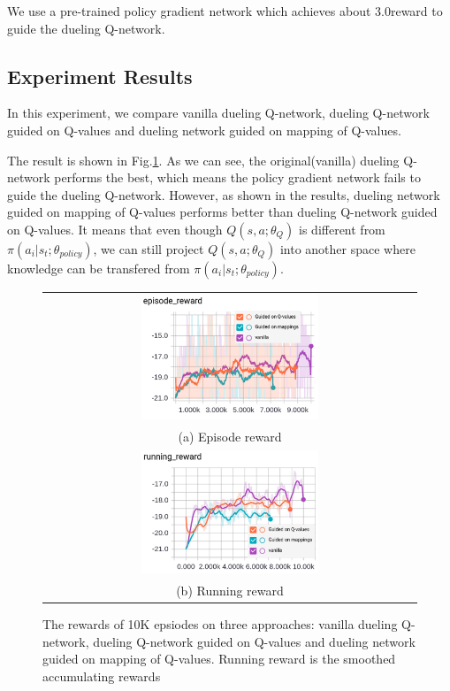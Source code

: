 %
We use a pre-trained policy gradient network which achieves about $3.0$reward to guide the dueling Q-network.


\subsection{Experiment Results}

In this experiment, we compare vanilla dueling Q-network, dueling Q-network guided on Q-values and dueling network guided on mapping of Q-values.

The result is shown in Fig.\ref{fig:mimic_result}. As we can see, the original(vanilla) dueling Q-network performs the best, which means the policy gradient network fails to guide the dueling Q-network.
%
However, as shown in the results, dueling network guided on mapping of Q-values performs better than dueling Q-network guided on Q-values. It means that even though $Q(s,a;\theta_{Q})$ is different from $\pi(a_i|s_t;\theta_{policy})$, we can still project $Q(s,a;\theta_{Q})$ into another space where knowledge can be transfered from $\pi(a_i|s_t;\theta_{policy})$.
\begin{figure}[h!]
	\centering
	\begin{tabular}{c}
		\includegraphics[width=0.49\textwidth]{./fig/mimic_result_episode.png} \\
		(a) Episode reward \\
		\includegraphics[width=0.49\textwidth]{./fig/mimic_result_running.png} \\
		(b) Running reward \\
	\end{tabular}
	\caption{The rewards of 10K epsiodes on three approaches: vanilla dueling Q-network, dueling Q-network guided on Q-values and dueling network guided on mapping of Q-values. Running reward is the smoothed accumulating rewards}
	\label{fig:mimic_result}
\end{figure}



